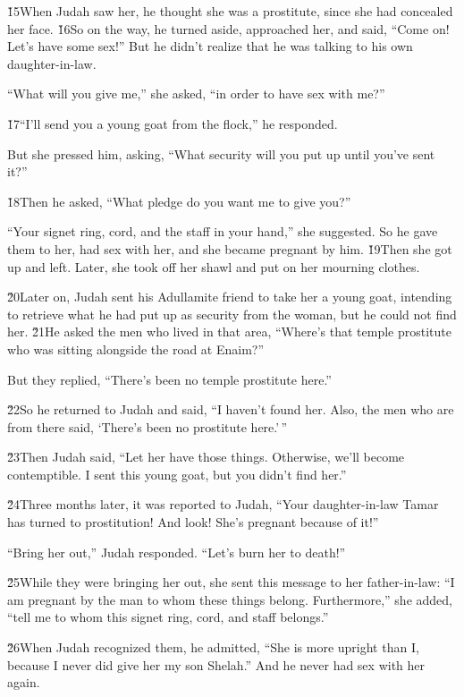 \v{15}When Judah saw her, he thought she was a prostitute, since she had concealed her face. \v{16}So on the way, he turned aside, approached her, and said, ``Come on! Let's have some sex!'' But he didn't realize that he was talking to his own daughter-in-law.

``What will you give me,'' she asked, ``in order to have sex with me?''

\v{17}``I'll send you a young goat from the flock,'' he responded.

But she pressed him, asking, ``What security will you put up until you've sent it?''

\v{18}Then he asked, ``What pledge do you want me to give you?''

``Your signet ring, cord, and the staff in your hand,'' she suggested. So he gave them to her, had sex with her, and she became pregnant by him. \v{19}Then she got up and left. Later, she took off her shawl and put on her mourning clothes.

\v{20}Later on, Judah sent his Adullamite friend to take her a young goat, intending to retrieve what he had put up as security from the woman, but he could not find her. \v{21}He asked the men who lived in that area, ``Where's that temple prostitute who was sitting alongside the road at Enaim?''

But they replied, ``There's been no temple prostitute here.''

\v{22}So he returned to Judah and said, ``I haven't found her. Also, the men who are from there said, `There's been no prostitute here.'\,''

\v{23}Then Judah said, ``Let her have those things. Otherwise, we'll become contemptible. I sent this young goat, but you didn't find her.''

\v{24}Three months later, it was reported to Judah, ``Your daughter-in-law Tamar has turned to prostitution! And look! She's pregnant because of it!''

``Bring her out,'' Judah responded. ``Let's burn her to death!''

\v{25}While they were bringing her out, she sent this message to her father-in-law: ``I am pregnant by the man to whom these things belong. Furthermore,'' she added, ``tell me to whom this signet ring, cord, and staff belongs.''

\v{26}When Judah recognized them, he admitted, ``She is more upright than I, because I never did give her my son Shelah.'' And he never had sex with her again.

